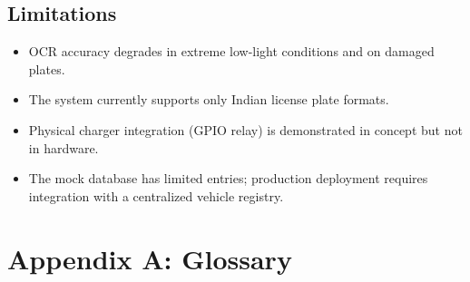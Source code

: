 \documentclass[11pt]{report}
\begin{document}
\section{Limitations}
\begin{itemize}
    \item OCR accuracy degrades in extreme low-light conditions and on damaged plates.
    \item The system currently supports only Indian license plate formats.
    \item Physical charger integration (GPIO relay) is demonstrated in concept but not in hardware.
    \item The mock database has limited entries; production deployment requires integration with a centralized vehicle registry.
\end{itemize}


\chapter{Appendix A: Glossary}
\end{document}
